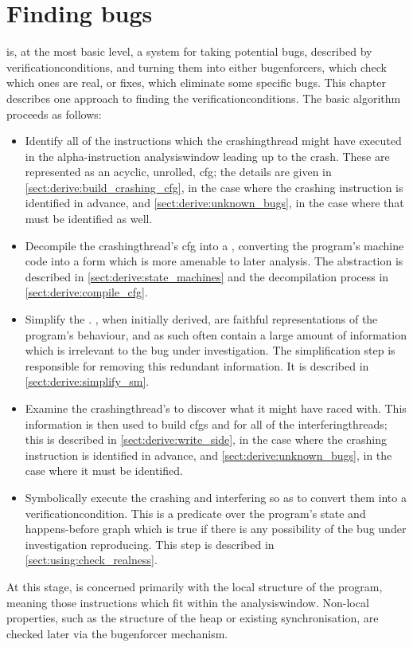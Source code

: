 \chapter{Finding bugs}
\label{sect:derive}

{\Technique} is, at the most basic level, a system for taking
potential bugs, described by \glspl{verificationcondition}, and
turning them into either \glspl{bugenforcer}, which check which ones
are real, or fixes, which eliminate some specific bugs.  This chapter
describes one approach to finding the \glspl{verificationcondition}.
The basic algorithm proceeds as follows:
\begin{itemize}
\item Identify all of the instructions which the \gls{crashingthread}
  might have executed in the \gls{alpha}-instruction
  \gls{analysiswindow} leading up to the crash.  These are represented
  as an acyclic, unrolled, \gls{cfg}; the details are given in
  \autoref{sect:derive:build_crashing_cfg}, in the case where the
  crashing instruction is identified in advance, and
  \autoref{sect:derive:unknown_bugs}, in the case where that must be
  identified as well.
\item Decompile the \gls{crashingthread}'s \gls{cfg} into a
  {\StateMachine}, converting the program's machine code into a form
  which is more amenable to later analysis.  The {\StateMachine}
  abstraction is described in \autoref{sect:derive:state_machines} and
  the decompilation process in \autoref{sect:derive:compile_cfg}.
\item Simplify the {\StateMachine}.  {\STateMachines}, when initially
  derived, are faithful representations of the program's behaviour,
  and as such often contain a large amount of information which is
  irrelevant to the bug under investigation.  The simplification step
  is responsible for removing this redundant information.  It is
  described in \autoref{sect:derive:simplify_sm}.
\item Examine the \gls{crashingthread}'s {\StateMachine} to discover
  what it might have raced with.  This information is then used to
  build \glspl{cfg} and {\StateMachines} for all of the
  \glspl{interferingthread}; this is described in
  \autoref{sect:derive:write_side}, in the case where the crashing
  instruction is identified in advance, and
  \autoref{sect:derive:unknown_bugs}, in the case where it must be
  identified.
\item Symbolically execute the crashing and interfering
  {\StateMachines} so as to convert them into a
  \gls{verificationcondition}.  This is a predicate over the program's
  state and happens-before graph which is true if there is any
  possibility of the bug under investigation reproducing.  This step
  is described in \autoref{sect:using:check_realness}.
\end{itemize}
At this stage, {\technique} is concerned primarily with the local
structure of the program, meaning those instructions which fit within
the \gls{analysiswindow}.  Non-local properties, such as the structure
of the heap or existing synchronisation, are checked later via the
\gls{bugenforcer} mechanism.

